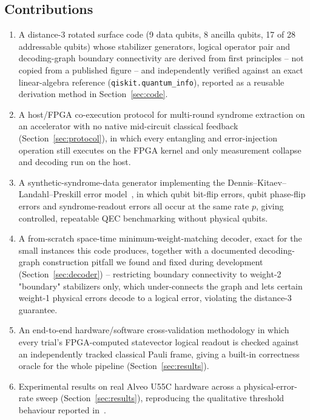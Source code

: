 \documentclass[pdflatex,sn-mathphys,Numbered]{sn-jnl}
\begin{document}
\subsection{Contributions}
\begin{enumerate}
\item A distance-3 rotated surface code (9 data qubits, 8 ancilla qubits, 17 of 28 addressable qubits) whose stabilizer generators, logical operator pair and decoding-graph boundary connectivity are derived from first principles -- not copied from a published figure -- and independently verified against an exact linear-algebra reference (\texttt{qiskit.quantum\_info}), reported as a reusable derivation method in Section~\ref{sec:code}.
\item A host/FPGA co-execution protocol for multi-round syndrome extraction on an accelerator with no native mid-circuit classical feedback (Section~\ref{sec:protocol}), in which every entangling and error-injection operation still executes on the FPGA kernel and only measurement collapse and decoding run on the host.
\item A synthetic-syndrome-data generator implementing the Dennis--Kitaev--Landahl--Preskill error model~\cite{dennis2002}, in which qubit bit-flip errors, qubit phase-flip errors and syndrome-readout errors all occur at the same rate $p$, giving controlled, repeatable QEC benchmarking without physical qubits.
\item A from-scratch space-time minimum-weight-matching decoder, exact for the small instances this code produces, together with a documented decoding-graph construction pitfall we found and fixed during development (Section~\ref{sec:decoder}) -- restricting boundary connectivity to weight-2 "boundary" stabilizers only, which under-connects the graph and lets certain weight-1 physical errors decode to a logical error, violating the distance-3 guarantee.
\item An end-to-end hardware/software cross-validation methodology in which every trial's FPGA-computed statevector logical readout is checked against an independently tracked classical Pauli frame, giving a built-in correctness oracle for the whole pipeline (Section~\ref{sec:results}).
\item Experimental results on real Alveo U55C hardware across a physical-error-rate sweep (Section~\ref{sec:results}), reproducing the qualitative threshold behaviour reported in~\cite{dennis2002}.
\end{enumerate}
\end{document}
